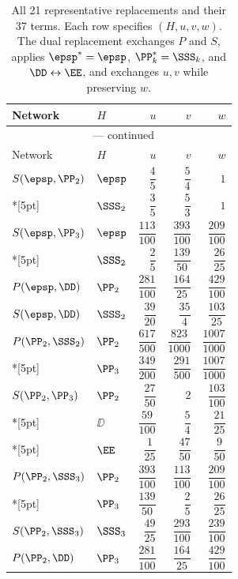 \begingroup\renewcommand{\arraystretch}{1.45}
\begin{longtable}{llrrr}
\caption{All 21 representative replacements and their 37 terms. Each row specifies $(H,u,v,w)$. The dual replacement exchanges $P$ and $S$, applies $\epsp^*=\epsp$, $\PP_k^*=\SSS_k$, and $\DD\leftrightarrow\EE$, and exchanges $u,v$ while preserving $w$.}\label{tab:replacements}\\
\toprule
Network & $H$ & $u$ & $v$ & $w$\\ \midrule
\endfirsthead
\multicolumn{5}{c}{\tablename~\thetable{} --- continued}\\[3pt]
\toprule
Network & $H$ & $u$ & $v$ & $w$\\ \midrule
\endhead
$S(\epsp,\PP_2)$ & $\epsp$ & $\dfrac{4}{5}$ & $\dfrac{5}{4}$ & $1$ \\*[5pt]
 & $\SSS_2$ & $\dfrac{3}{5}$ & $\dfrac{5}{3}$ & $1$ \\[7pt]
$S(\epsp,\PP_3)$ & $\epsp$ & $\dfrac{113}{100}$ & $\dfrac{393}{100}$ & $\dfrac{209}{100}$ \\*[5pt]
 & $\SSS_2$ & $\dfrac{2}{5}$ & $\dfrac{139}{50}$ & $\dfrac{26}{25}$ \\[7pt]
$P(\epsp,\DD)$ & $\PP_2$ & $\dfrac{281}{100}$ & $\dfrac{164}{25}$ & $\dfrac{429}{100}$ \\[7pt]
$S(\epsp,\DD)$ & $\SSS_2$ & $\dfrac{39}{20}$ & $\dfrac{35}{4}$ & $\dfrac{103}{25}$ \\[7pt]
$P(\PP_2,\SSS_2)$ & $\PP_2$ & $\dfrac{617}{500}$ & $\dfrac{823}{1000}$ & $\dfrac{1007}{1000}$ \\*[5pt]
 & $\PP_3$ & $\dfrac{349}{200}$ & $\dfrac{291}{500}$ & $\dfrac{1007}{1000}$ \\[7pt]
$S(\PP_2,\PP_3)$ & $\PP_2$ & $\dfrac{27}{50}$ & $2$ & $\dfrac{103}{100}$ \\*[5pt]
 & $\DD$ & $\dfrac{59}{100}$ & $\dfrac{5}{4}$ & $\dfrac{21}{25}$ \\*[5pt]
 & $\EE$ & $\dfrac{1}{25}$ & $\dfrac{47}{50}$ & $\dfrac{9}{50}$ \\[7pt]
$P(\PP_2,\SSS_3)$ & $\PP_2$ & $\dfrac{393}{100}$ & $\dfrac{113}{100}$ & $\dfrac{209}{100}$ \\*[5pt]
 & $\PP_3$ & $\dfrac{139}{50}$ & $\dfrac{2}{5}$ & $\dfrac{26}{25}$ \\[7pt]
$S(\PP_2,\SSS_3)$ & $\SSS_3$ & $\dfrac{49}{25}$ & $\dfrac{293}{100}$ & $\dfrac{239}{100}$ \\[7pt]
$P(\PP_2,\DD)$ & $\PP_3$ & $\dfrac{281}{100}$ & $\dfrac{164}{25}$ & $\dfrac{429}{100}$ \\[7pt]

\end{longtable}
